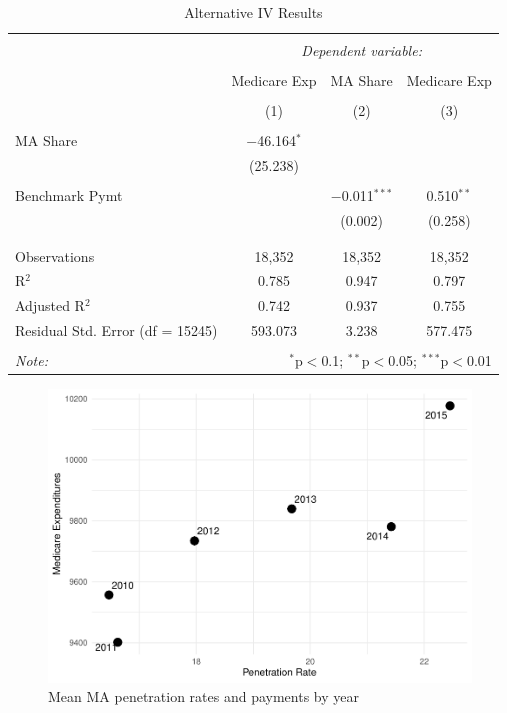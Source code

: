 \documentclass[
  12pt,
]{article}
\begin{document}
\newpage

\begin{table}[H] \centering 
  \caption{Alternative IV Results} 
  \label{tab:sens1} 
\begin{tabular}{@{\extracolsep{5pt}}lccc} 
\\[-1.8ex]\hline 
\hline \\[-1.8ex] 
 & \multicolumn{3}{c}{\textit{Dependent variable:}} \\ 
\cline{2-4} 
\\[-1.8ex] & Medicare Exp & MA Share & Medicare Exp \\ 
\\[-1.8ex] & (1) & (2) & (3)\\ 
\hline \\[-1.8ex] 
 MA Share & $-$46.164$^{*}$ &  &  \\ 
  & (25.238) &  &  \\ 
  & & & \\ 
 Benchmark Pymt &  & $-$0.011$^{***}$ & 0.510$^{**}$ \\ 
  &  & (0.002) & (0.258) \\ 
  & & & \\ 
\hline \\[-1.8ex] 
Observations & 18,352 & 18,352 & 18,352 \\ 
R$^{2}$ & 0.785 & 0.947 & 0.797 \\ 
Adjusted R$^{2}$ & 0.742 & 0.937 & 0.755 \\ 
Residual Std. Error (df = 15245) & 593.073 & 3.238 & 577.475 \\ 
\hline 
\hline \\[-1.8ex] 
\textit{Note:}  & \multicolumn{3}{r}{$^{*}$p$<$0.1; $^{**}$p$<$0.05; $^{***}$p$<$0.01} \\ 
\end{tabular} 
\end{table}

\newpage

\begin{figure}
\centering
\includegraphics{solutions_files/figure-latex/scatter-1.pdf}
\caption{\label{fig:scatter}Mean MA penetration rates and payments by year}
\end{figure}
\end{document}
